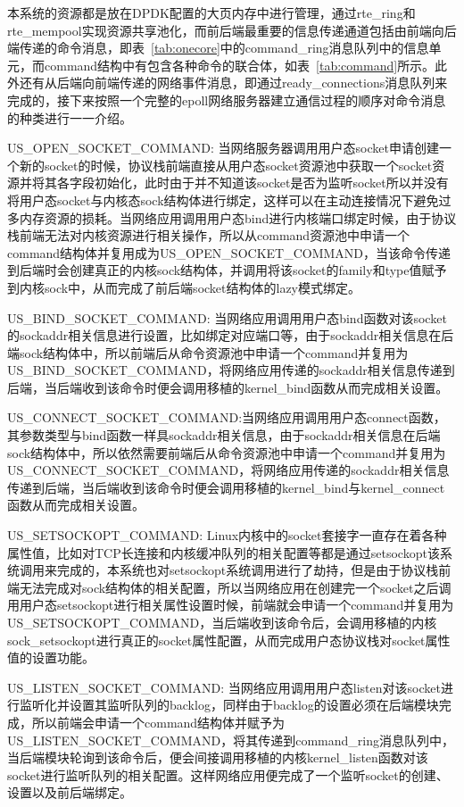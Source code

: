 本系统的资源都是放在DPDK配置的大页内存中进行管理，通过rte\_ring和rte\_mempool实现资源共享池化，而前后端最重要的信息传递通道包括由前端向后端传递的命令消息，即表~\ref{tab:onecore}中的command\_ring消息队列中的信息单元，而command结构中有包含各种命令的联合体，如表~\ref{tab:command}所示。此外还有从后端向前端传递的网络事件消息，即通过ready\_connections消息队列来完成的，接下来按照一个完整的epoll网络服务器建立通信过程的顺序对命令消息的种类进行一一介绍。

US\_OPEN\_SOCKET\_COMMAND: 当网络服务器调用用户态socket申请创建一个新的socket的时候，协议栈前端直接从用户态socket资源池中获取一个socket资源并将其各字段初始化，此时由于并不知道该socket是否为监听socket所以并没有将用户态socket与内核态sock结构体进行绑定，这样可以在主动连接情况下避免过多内存资源的损耗。当网络应用调用用户态bind进行内核端口绑定时候，由于协议栈前端无法对内核资源进行相关操作，所以从command资源池中申请一个command结构体并复用成为US\_OPEN\_SOCKET\_COMMAND，当该命令传递到后端时会创建真正的内核sock结构体，并调用将该socket的family和type值赋予到内核sock中，从而完成了前后端socket结构体的lazy模式绑定。

US\_BIND\_SOCKET\_COMMAND: 当网络应用调用用户态bind函数对该socket的sockaddr相关信息进行设置，比如绑定对应端口等，由于sockaddr相关信息在后端sock结构体中，所以前端后从命令资源池中申请一个command并复用为US\_BIND\_SOCKET\_COMMAND，将网络应用传递的sockaddr相关信息传递到后端，当后端收到该命令时便会调用移植的kernel\_bind函数从而完成相关设置。

US\_CONNECT\_SOCKET\_COMMAND:当网络应用调用用户态connect函数，其参数类型与bind函数一样具sockaddr相关信息，由于sockaddr相关信息在后端sock结构体中，所以依然需要前端后从命令资源池中申请一个command并复用为US\_CONNECT\_SOCKET\_COMMAND，将网络应用传递的sockaddr相关信息传递到后端，当后端收到该命令时便会调用移植的kernel\_bind与kernel\_connect函数从而完成相关设置。

US\_SETSOCKOPT\_COMMAND: Linux内核中的socket套接字一直存在着各种属性值，比如对TCP长连接和内核缓冲队列的相关配置等都是通过setsockopt该系统调用来完成的，本系统也对setsockopt系统调用进行了劫持，但是由于协议栈前端无法完成对sock结构体的相关配置，所以当网络应用在创建完一个socket之后调用用户态setsockopt进行相关属性设置时候，前端就会申请一个command并复用为US\_SETSOCKOPT\_COMMAND，当后端收到该命令后，会调用移植的内核sock\_setsockopt进行真正的socket属性配置，从而完成用户态协议栈对socket属性值的设置功能。

US\_LISTEN\_SOCKET\_COMMAND: 当网络应用调用用户态listen对该socket进行监听化并设置其监听队列的backlog，同样由于backlog的设置必须在后端模块完成，所以前端会申请一个command结构体并赋予为US\_LISTEN\_SOCKET\_COMMAND，将其传递到command\_ring消息队列中，当后端模块轮询到该命令后，便会间接调用移植的内核kernel\_listen函数对该socket进行监听队列的相关配置。这样网络应用便完成了一个监听socket的创建、设置以及前后端绑定。

